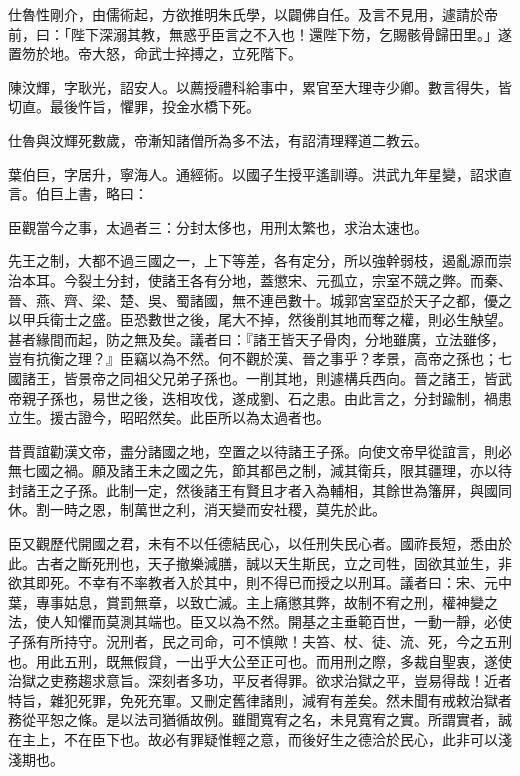 \begin{pinyinscope}
仕魯性剛介，由儒術起，方欲推明朱氏學，以闢佛自任。及言不見用，遽請於帝前，曰：「陛下深溺其教，無惑乎臣言之不入也！還陛下笏，乞賜骸骨歸田里。」遂置笏於地。帝大怒，命武士捽搏之，立死階下。

陳汶輝，字耿光，詔安人。以薦授禮科給事中，累官至大理寺少卿。數言得失，皆切直。最後忤旨，懼罪，投金水橋下死。

仕魯與汶輝死數歲，帝漸知諸僧所為多不法，有詔清理釋道二教云。

葉伯巨，字居升，寧海人。通經術。以國子生授平遙訓導。洪武九年星變，詔求直言。伯巨上書，略曰：

臣觀當今之事，太過者三：分封太侈也，用刑太繁也，求治太速也。

先王之制，大都不過三國之一，上下等差，各有定分，所以強幹弱枝，遏亂源而崇治本耳。今裂土分封，使諸王各有分地，蓋懲宋、元孤立，宗室不競之弊。而秦、晉、燕、齊、梁、楚、吳、蜀諸國，無不連邑數十。城郭宮室亞於天子之都，優之以甲兵衛士之盛。臣恐數世之後，尾大不掉，然後削其地而奪之權，則必生觖望。甚者緣間而起，防之無及矣。議者曰：『諸王皆天子骨肉，分地雖廣，立法雖侈，豈有抗衡之理？』臣竊以為不然。何不觀於漢、晉之事乎？孝景，高帝之孫也；七國諸王，皆景帝之同祖父兄弟子孫也。一削其地，則遽構兵西向。晉之諸王，皆武帝親子孫也，易世之後，迭相攻伐，遂成劉、石之患。由此言之，分封踰制，禍患立生。援古證今，昭昭然矣。此臣所以為太過者也。

昔賈誼勸漢文帝，盡分諸國之地，空置之以待諸王子孫。向使文帝早從誼言，則必無七國之禍。願及諸王未之國之先，節其都邑之制，減其衛兵，限其疆理，亦以待封諸王之子孫。此制一定，然後諸王有賢且才者入為輔相，其餘世為籓屏，與國同休。割一時之恩，制萬世之利，消天變而安社稷，莫先於此。

臣又觀歷代開國之君，未有不以任德結民心，以任刑失民心者。國祚長短，悉由於此。古者之斷死刑也，天子撤樂減膳，誠以天生斯民，立之司牲，固欲其並生，非欲其即死。不幸有不率教者入於其中，則不得已而授之以刑耳。議者曰：宋、元中葉，專事姑息，賞罰無章，以致亡滅。主上痛懲其弊，故制不宥之刑，權神變之法，使人知懼而莫測其端也。臣又以為不然。開基之主垂範百世，一動一靜，必使子孫有所持守。況刑者，民之司命，可不慎歟！夫笞、杖、徒、流、死，今之五刑也。用此五刑，既無假貸，一出乎大公至正可也。而用刑之際，多裁自聖衷，遂使治獄之吏務趨求意旨。深刻者多功，平反者得罪。欲求治獄之平，豈易得哉！近者特旨，雜犯死罪，免死充軍。又刪定舊律諸則，減宥有差矣。然未聞有戒敕治獄者務從平恕之條。是以法司猶循故例。雖聞寬宥之名，未見寬宥之實。所謂實者，誠在主上，不在臣下也。故必有罪疑惟輕之意，而後好生之德洽於民心，此非可以淺淺期也。


\end{pinyinscope}
